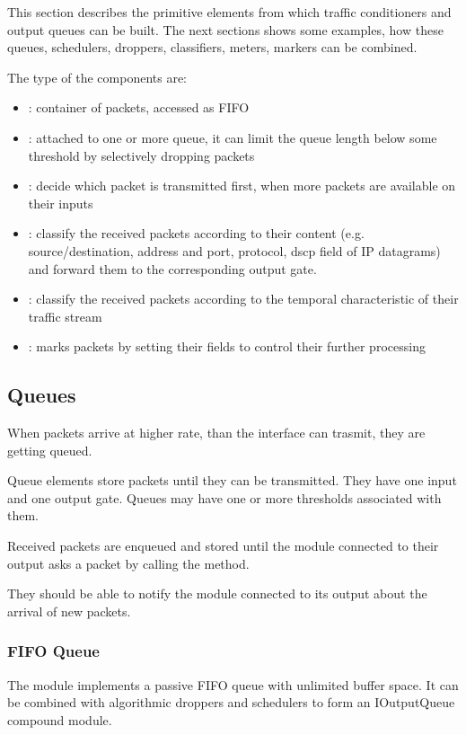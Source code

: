 This section describes the primitive elements from which traffic
conditioners and output queues can be built. The next sections
shows some examples, how these queues, schedulers, droppers,
classifiers, meters, markers can be combined.

The type of the components are:
\begin{itemize}
  \item {}: container of packets, accessed as FIFO
  \item {}: attached to one or more queue, it can
    limit the queue length below some threshold
    by selectively dropping packets
  \item {}: decide which packet is transmitted first,
     when more packets are available on their inputs
  \item {}: classify the received packets
     according to their content (e.g. source/destination,
     address and port, protocol, dscp field of IP datagrams)
     and forward them to the corresponding output gate.
  \item {}: classify the received packets
      according to the temporal characteristic of their
      traffic stream
  \item {}: marks packets by setting their fields
      to control their further processing
\end{itemize}

\subsection{Queues}

When packets arrive at higher rate, than the interface can trasmit,
they are getting queued.


Queue elements store packets until they can be transmitted.
They have one input and one output gate.
Queues may have one or more thresholds associated with them.

 Received packets
are enqueued and stored until the module connected to their
output asks a packet by calling the 
method.

They should be able to notify the module connected to its output
about the arrival of new packets.

\subsubsection{FIFO Queue}

The  module implements a passive
FIFO queue with unlimited buffer space. It can be combined
with algorithmic droppers and schedulers to form an
IOutputQueue compound module.

